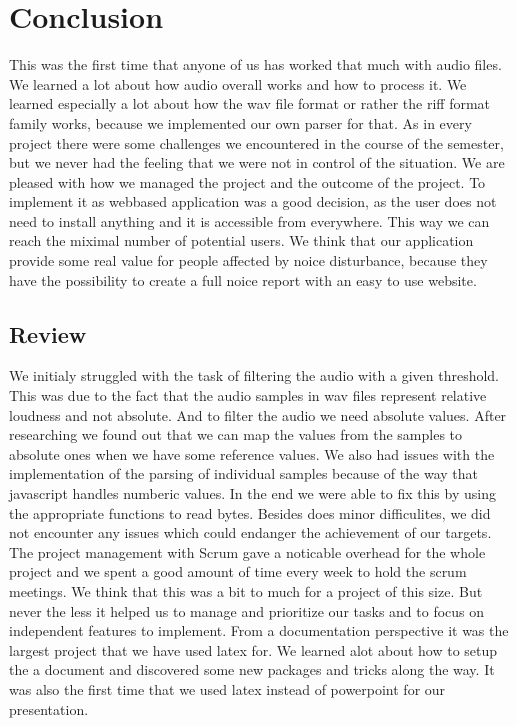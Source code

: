 \section{Conclusion}
This was the first time that anyone of us has worked that much with audio files. We learned a lot about how audio overall works and how to process it. We learned especially a lot about how the wav file format or rather the riff format family works, because we implemented our own parser for that. As in every project there were some challenges we encountered in the course of the semester, but we never had the feeling that we were not in control of the situation. We are pleased with how we managed the project and the outcome of the project. To implement it as webbased application was a good decision, as the user does not need to install anything and it is accessible from everywhere. This way we can reach the miximal number of potential users. We think that our application provide some real value for people affected by noice disturbance, because they have the possibility to create a full noice report with an easy to use website.

\subsection{Review}
We initialy struggled with the task of filtering the audio with a given threshold. This was due to the fact that the audio samples in wav files represent relative loudness and not absolute. And to filter the audio we need absolute values. After researching we found out that we can map the values from the samples to absolute ones when we have some reference values. 
We also had issues with the implementation of the parsing of individual samples because of the way that javascript handles numberic values. In the end we were able to fix this by using the appropriate functions to read bytes. Besides does minor difficulites, we did not encounter any issues which could endanger the achievement of our targets. 
The project management with Scrum gave a noticable overhead for the whole project and we spent a good amount of time every week to hold the scrum meetings. We think that this was a bit to much for a project of this size. But never the less it helped us to manage and prioritize our tasks and to focus on independent features to implement. 
From a documentation perspective it was the largest project that we have used latex for. We learned alot about how to setup the a document and discovered some new packages and tricks along the way. It was also the first time that we used latex instead of powerpoint for our presentation.

